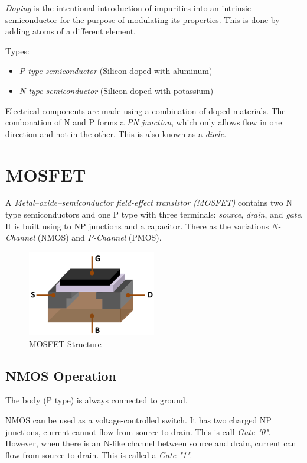 \documentclass[00_complete]{subfiles}
\begin{document}
\textit{Doping} is the intentional introduction of impurities into an intrinsic
semiconductor for the purpose of modulating its properties. This is done by
adding atoms of a different element.

Types:
\begin{itemize}
    \item \textit{P-type semiconductor} (Silicon doped with aluminum)
    \item \textit{N-type semiconductor} (Silicon doped with potassium)
\end{itemize}
Electrical components are made using a combination of doped materials. The
combonation of N and P forms a \textit{PN junction}, which only allows flow in one
direction and not in the other. This is also known as a \textit{diode}.
\section{MOSFET}
A \textit{Metal–oxide–semiconductor field-effect transistor (MOSFET)} contains
two N type semiconductors and one P type with three terminals: \textit{source},
\textit{drain}, and \textit{gate}. It is built using to NP junctions and a
capacitor. There as the variations \textit{N-Channel} (NMOS) and
\textit{P-Channel} (PMOS).
\begin{figure}[ht!]
    \begin{center}
        \includegraphics[width=0.5\textwidth]{mosfet}
    \end{center}
    \caption{MOSFET Structure}
\end{figure}
\subsection{NMOS Operation}
The body (P type) is always connected to ground. 

NMOS can be used as a voltage-controlled switch. It has two charged NP
junctions, current cannot flow from source to drain. This is call \textit{Gate 
"0"}. However, when there is an N-like channel between source and drain, current
can flow from source to drain. This is called a \textit{Gate "1"}.
\end{document}
